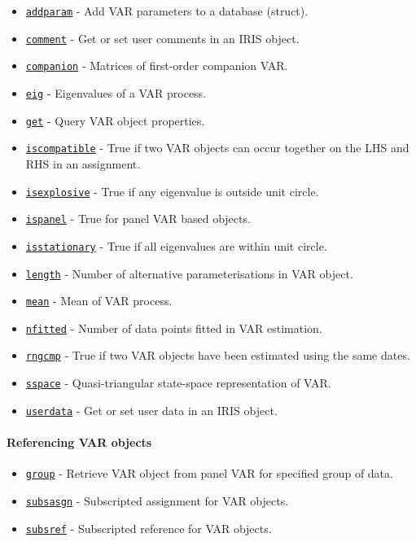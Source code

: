  \begin{itemize}
 \item
   \href{VAR/addparam}{\texttt{addparam}} - Add VAR parameters to a
   database (struct).
 \item
   \href{VAR/comment}{\texttt{comment}} - Get or set user comments in an
   IRIS object.
 \item
   \href{VAR/companion}{\texttt{companion}} - Matrices of first-order
   companion VAR.
 \item
   \href{VAR/eig}{\texttt{eig}} - Eigenvalues of a VAR process.
 \item
   \href{VAR/get}{\texttt{get}} - Query VAR object properties.
 \item
   \href{VAR/iscompatible}{\texttt{iscompatible}} - True if two VAR
   objects can occur together on the LHS and RHS in an assignment.
 \item
   \href{VAR/isexplosive}{\texttt{isexplosive}} - True if any eigenvalue
   is outside unit circle.
 \item
   \href{VAR/ispanel}{\texttt{ispanel}} - True for panel VAR based
   objects.
 \item
   \href{VAR/isstationary}{\texttt{isstationary}} - True if all
   eigenvalues are within unit circle.
 \item
   \href{VAR/length}{\texttt{length}} - Number of alternative
   parameterisations in VAR object.
 \item
   \href{VAR/mean}{\texttt{mean}} - Mean of VAR process.
 \item
   \href{VAR/nfitted}{\texttt{nfitted}} - Number of data points fitted in
   VAR estimation.
 \item
   \href{VAR/rngcmp}{\texttt{rngcmp}} - True if two VAR objects have been
   estimated using the same dates.
 \item
   \href{VAR/sspace}{\texttt{sspace}} - Quasi-triangular state-space
   representation of VAR.
 \item
   \href{VAR/userdata}{\texttt{userdata}} - Get or set user data in an
   IRIS object.
 \end{itemize}
 
 \paragraph{Referencing VAR objects}
 
 \begin{itemize}
 \item
   \href{VAR/group}{\texttt{group}} - Retrieve VAR object from panel VAR
   for specified group of data.
 \item
   \href{VAR/subsasgn}{\texttt{subsasgn}} - Subscripted assignment for
   VAR objects.
 \item
   \href{VAR/subsref}{\texttt{subsref}} - Subscripted reference for VAR
   objects.
 \end{itemize}
 
